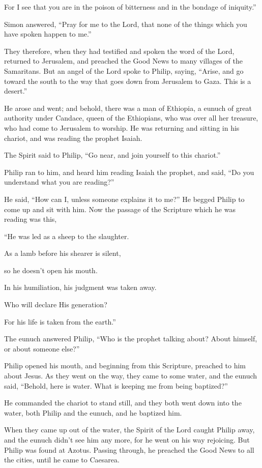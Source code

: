 {For I see that you are in the poison of bitterness and in the bondage of iniquity.”
\par }{\PP {}Simon answered, “Pray for me to the Lord, that none of the things which you have spoken happen to me.”
\par }{\PP {}They therefore, when they had testified and spoken the word of the Lord, returned to Jerusalem, and preached the Good News to many villages of the Samaritans.
But an angel of the Lord spoke to Philip, saying, “Arise, and go toward the south to the way that goes down from Jerusalem to Gaza. This is a desert.”
\par }{\PP {}He arose and went; and behold, there was a man of Ethiopia, a eunuch of great authority under Candace, queen of the Ethiopians, who was over all her treasure, who had come to Jerusalem to worship.
He was returning and sitting in his chariot, and was reading the prophet Isaiah.
\par }{\PP {}The Spirit said to Philip, “Go near, and join yourself to this chariot.”
\par }{\PP {}Philip ran to him, and heard him reading Isaiah the prophet, and said, “Do you understand what you are reading?”
\par }{\PP {}He said, “How can I, unless someone explains it to me?” He begged Philip to come up and sit with him.
Now the passage of the Scripture which he was reading was this,
\par }{\Q “He was led as a sheep to the slaughter.
\par }{\QB As a lamb before his shearer is silent,
\par }{\QB so he doesn’t open his mouth.
\par }{\Q {}In his humiliation, his judgment was taken away.
\par }{\QB Who will declare His generation?
\par }{\QB For his life is taken from the earth.”
\par }{\PP {}The eunuch answered Philip, “Who is the prophet talking about? About himself, or about someone else?”
\par }{\PP {}Philip opened his mouth, and beginning from this Scripture, preached to him about Jesus.
As they went on the way, they came to some water, and the eunuch said, “Behold, here is water. What is keeping me from being baptized?”
\par }{\PP {}
He commanded the chariot to stand still, and they both went down into the water, both Philip and the eunuch, and he baptized him.
\par }{\PP {}When they came up out of the water, the Spirit of the Lord caught Philip away, and the eunuch didn’t see him any more, for he went on his way rejoicing.
But Philip was found at Azotus. Passing through, he preached the Good News to all the cities, until he came to Caesarea.

}
